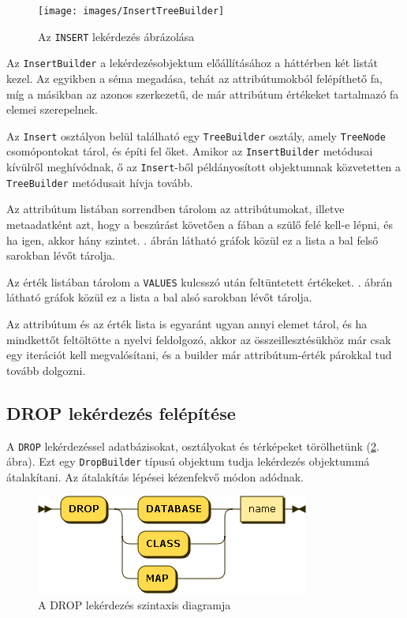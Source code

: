\begin{figure}[htb]
	\begin{center}
		\texttt{[image: images/InsertTreeBuilder]}
		\caption{Az \texttt{INSERT} lekérdezés ábrázolása}
		\label{fig:insertTreeBuilder}
	\end{center}
\end{figure}

Az \texttt{InsertBuilder} a lekérdezésobjektum előállításához a háttérben két listát kezel. Az egyikben a séma megadása, tehát az attribútumokból felépíthető fa, míg a másikban az azonos szerkezetű, de már attribútum értékeket tartalmazó fa elemei szerepelnek.

Az \texttt{Insert} osztályon belül található egy \texttt{TreeBuilder} osztály, amely \texttt{TreeNode} csomópontokat tárol, és építi fel őket.
Amikor az \texttt{InsertBuilder} metódusai kívülről meghívódnak, ő az \texttt{Insert}-ből példányosított objektumnak közvetetten a \texttt{TreeBuilder} metódusait hívja tovább.

Az attribútum listában sorrendben tárolom az attribútumokat, illetve metaadatként azt, hogy a beszúrást követően a fában a szülő felé kell-e lépni, és ha igen, akkor hány szintet. . ábrán látható gráfok közül ez a lista a bal felső sarokban lévőt tárolja.

Az érték listában tárolom a \texttt{VALUES} kulcsszó után feltüntetett értékeket. . ábrán látható gráfok közül ez a lista a bal alsó sarokban lévőt tárolja.


Az attribútum és az érték lista is egyaránt ugyan annyi elemet tárol, és ha mindkettőt feltöltötte a nyelvi feldolgozó, akkor az összeillesztésükhöz már csak egy iterációt kell megvalósítani, és a builder már attribútum-érték párokkal tud tovább dolgozni.

\subsection{DROP lekérdezés felépítése}

A \texttt{DROP} lekérdezéssel adatbázisokat, osztályokat és térképeket törölhetünk (\ref{fig:dropSytnax}. ábra). Ezt egy \texttt{DropBuilder} típusú objektum tudja lekérdezés objektummá átalakítani. Az átalakítás lépései kézenfekvő módon adódnak.

\begin{figure}[htb]
	\begin{center}
		\includegraphics[scale=0.6]{images/drop_expr}
		\caption{A DROP lekérdezés szintaxis diagramja}
		\label{fig:dropSytnax}
	\end{center}
\end{figure}

